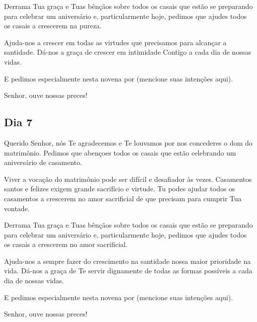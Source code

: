 \documentclass[18pt]{article}
\begin{document}
Derrama Tua graça e Tuas bênçãos sobre todos os casais que estão se preparando para celebrar um aniversário e, particularmente hoje, pedimos que ajudes todos os casais a crescerem na pureza.  

Ajuda-nos a crescer em todas as virtudes que precisamos para alcançar a santidade. Dá-nos a graça de crescer em intimidade Contigo a cada dia de nossas vidas.  

E pedimos especialmente nesta novena por (mencione suas intenções aqui).  

Senhor, ouve nossas preces!  

\begin{center}
 \textbf{}
\end{center}



\begin{center}
 \subsection*{Dia 7}
\end{center}



Querido Senhor, nós Te agradecemos e Te louvamos por nos concederes o dom do matrimônio. Pedimos que abençoes todos os casais que estão celebrando um aniversário de casamento.  

Viver a vocação do matrimônio pode ser difícil e desafiador às vezes. Casamentos santos e felizes exigem grande sacrifício e virtude. Tu podes ajudar todos os casamentos a crescerem no amor sacrificial de que precisam para cumprir Tua vontade.  

Derrama Tua graça e Tuas bênçãos sobre todos os casais que estão se preparando para celebrar um aniversário e, particularmente hoje, pedimos que ajudes todos os casais a crescerem no amor sacrificial.  

Ajuda-nos a sempre fazer do crescimento na santidade nossa maior prioridade na vida. Dá-nos a graça de Te servir dignamente de todas as formas possíveis a cada dia de nossas vidas.  

E pedimos especialmente nesta novena por (mencione suas intenções aqui).  

Senhor, ouve nossas preces!  

\begin{center}
 \textbf{}
\end{center}
\end{document}
